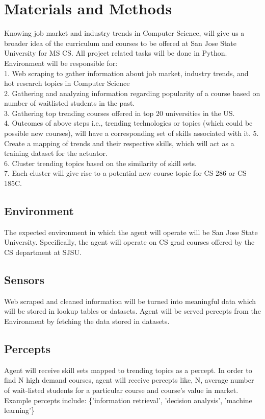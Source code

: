 \documentclass{article}
\begin{document}
\section{Materials and Methods}
Knowing job market and industry trends in Computer Science, will give us a broader idea of the curriculum and courses to be offered at San Jose State University for MS CS. All project related tasks will be done in Python. \\
Environment will be responsible for: \\
1. Web scraping to gather information about job market, industry trends, and hot research topics in Computer Science \\
2. Gathering and analyzing information regarding popularity of a course based on number of waitlisted students in the past. \\
3. Gathering top trending courses offered in top 20 universities in the US. \\
4. Outcomes of above steps i.e., trending technologies or topics (which could be possible new courses), will have a corresponding set of skills associated with it. 
5. Create a mapping of trends and their respective skills, which will act as a training dataset for the actuator. \\
6. Cluster trending topics based on the similarity of skill sets. \\
7. Each cluster will give rise to a potential new course topic for CS 286 or CS 185C. 

\subsection{Environment}
The expected environment in which the agent will operate will be San Jose State University. Specifically, the agent will operate on CS grad courses offered by the CS department at SJSU. 

\subsection{Sensors}
Web scraped and cleaned information will be turned into meaningful data which will be stored in lookup tables or datasets.
Agent will be served percepts from the Environment by fetching the data stored in datasets. 

\subsection{Percepts}
Agent will receive skill sets mapped to trending topics as a percept. In order to find N high demand courses, agent will receive percepts like, N, average number of wait-listed students for a particular course and course's value in market. Example percepts include: 
\{'information retrieval', 'decision analysis', 'machine learning'\}
\end{document}
